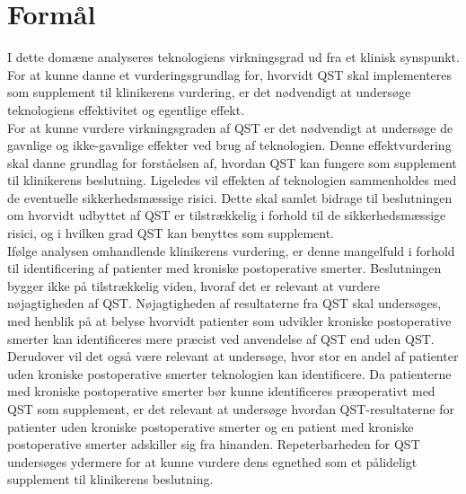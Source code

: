 \section{Formål}
I dette domæne analyseres teknologiens virkningsgrad ud fra et klinisk synspunkt. For at kunne danne et vurderingsgrundlag for, hvorvidt QST skal implementeres som supplement til klinikerens vurdering, er det nødvendigt at undersøge teknologiens effektivitet og egentlige effekt.\\
For at kunne vurdere virkningsgraden af QST er det nødvendigt at undersøge de gavnlige og ikke-gavnlige effekter ved brug af teknologien. Denne effektvurdering skal danne grundlag for forståelsen af, hvordan QST kan fungere som supplement til klinikerens beslutning. Ligeledes vil effekten af teknologien sammenholdes med de eventuelle sikkerhedsmæssige risici. Dette skal samlet bidrage til beslutningen om hvorvidt udbyttet af QST er tilstrækkelig i forhold til de sikkerhedsmæssige risici, og i hvilken grad QST kan benyttes som supplement. \\
Ifølge analysen omhandlende klinikerens vurdering, er denne mangelfuld i forhold til identificering af patienter med kroniske postoperative smerter. Beslutningen bygger ikke på tilstrækkelig viden, hvoraf det er relevant at vurdere nøjagtigheden af QST. Nøjagtigheden af resultaterne fra QST skal undersøges, med henblik på at belyse hvorvidt patienter som udvikler kroniske postoperative smerter kan identificeres mere præcist ved anvendelse af QST end uden QST. Derudover vil det også være relevant at undersøge, hvor stor en andel af patienter uden kroniske postoperative smerter teknologien kan identificere. Da patienterne med kroniske postoperative smerter bør kunne identificeres præoperativt med QST som supplement, er det relevant at undersøge hvordan QST-resultaterne for patienter uden kroniske postoperative smerter og en patient med kroniske postoperative smerter adskiller sig fra hinanden. Repeterbarheden for QST undersøges ydermere for at kunne vurdere dens egnethed som et pålideligt supplement til klinikerens beslutning.

